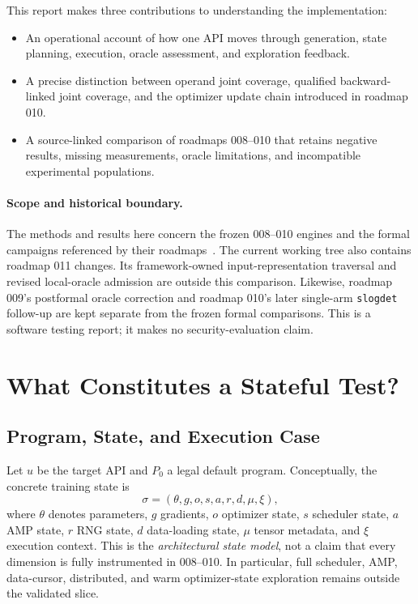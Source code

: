 \documentclass[conference]{IEEEtran}
\begin{document}
This report makes three contributions to understanding the implementation:
\begin{itemize}
\item An operational account of how one API moves through generation, state planning, execution, oracle assessment, and exploration feedback.
\item A precise distinction between operand joint coverage, qualified backward-linked joint coverage, and the optimizer update chain introduced in roadmap 010.
\item A source-linked comparison of roadmaps 008--010 that retains negative results, missing measurements, oracle limitations, and incompatible experimental populations.
\end{itemize}

\paragraph{Scope and historical boundary.}
The methods and results here concern the frozen 008--010 engines and the formal campaigns referenced by their roadmaps~\cite{rm008,rm009,rm010}. The current working tree also contains roadmap 011 changes. Its framework-owned input-representation traversal and revised local-oracle admission are outside this comparison. Likewise, roadmap 009's postformal oracle correction and roadmap 010's later single-arm \texttt{slogdet} follow-up are kept separate from the frozen formal comparisons. This is a software testing report; it makes no security-evaluation claim.

\section{What Constitutes a Stateful Test?}
\subsection{Program, State, and Execution Case}
Let $u$ be the target API and $P_0$ a legal default program. Conceptually, the concrete training state is
\begin{equation}
 \sigma=(\theta,g,o,s,a,r,d,\mu,\xi),
\end{equation}
where $\theta$ denotes parameters, $g$ gradients, $o$ optimizer state, $s$ scheduler state, $a$ AMP state, $r$ RNG state, $d$ data-loading state, $\mu$ tensor metadata, and $\xi$ execution context. This is the \emph{architectural state model}, not a claim that every dimension is fully instrumented in 008--010. In particular, full scheduler, AMP, data-cursor, distributed, and warm optimizer-state exploration remains outside the validated slice.
\end{document}
